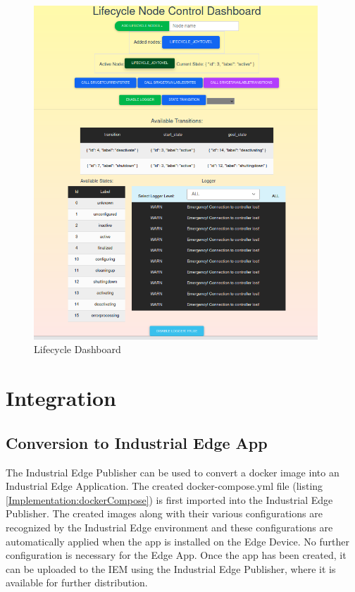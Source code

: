 \begin{figure}[H]
	\centering
	\includegraphics[width=0.95\textwidth]{"Bilder/lifecycle-dashboard.png"}
	\caption{Lifecycle Dashboard}
	\label{fig:Background:LifecycleDashboard}					
\end{figure}

\section{Integration}
\label{Implementierung:Integration}

\subsection{Conversion to Industrial Edge App} 
The Industrial Edge Publisher can be used to convert a docker image into an Industrial Edge Application. The created docker-compose.yml file (listing \ref{Implementation:dockerCompose}) is first imported into the Industrial Edge Publisher. The created images along with their various configurations are recognized by the Industrial Edge environment and these configurations are automatically applied when the app is installed on the Edge Device. No further configuration is necessary for the Edge App. Once the app has been created, it can be uploaded to the IEM using the Industrial Edge Publisher, where it is available for further distribution.

